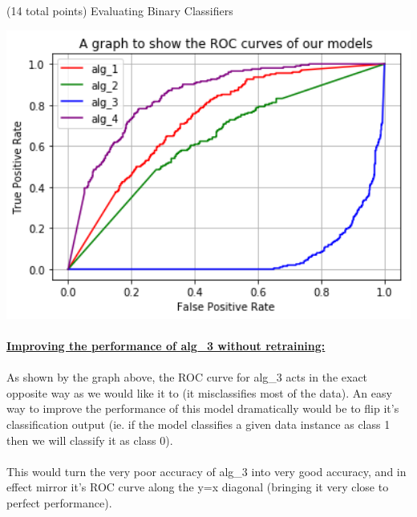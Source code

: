 \documentclass[12pt]{article}
\begin{document}
\begin{question}{(14 total points) Evaluating Binary Classifiers}
\begin{subquestion}
\begin{answerbox}{43em}
\includegraphics [width=1\textwidth]{images/q4c-graph.png}\\
\\
\large{\textbf{\underline{Improving the performance of alg\_3 without retraining:}}}\\
\\
\normalsize{
As shown by the graph above, the ROC curve for alg\_3 acts in the exact opposite way as we would like it to (it misclassifies most of the data). An easy way to improve the performance of this model dramatically would be to flip it's classification output (ie. if the model classifies a given data instance as class 1 then we will classify it as class 0).\\\
\\
This would turn the very poor accuracy of alg\_3 into very good accuracy, and in effect mirror it's ROC curve along the y=x diagonal (bringing it very close to perfect performance).
}
\end{answerbox}



\end{subquestion}

\end{question}
\end{document}
